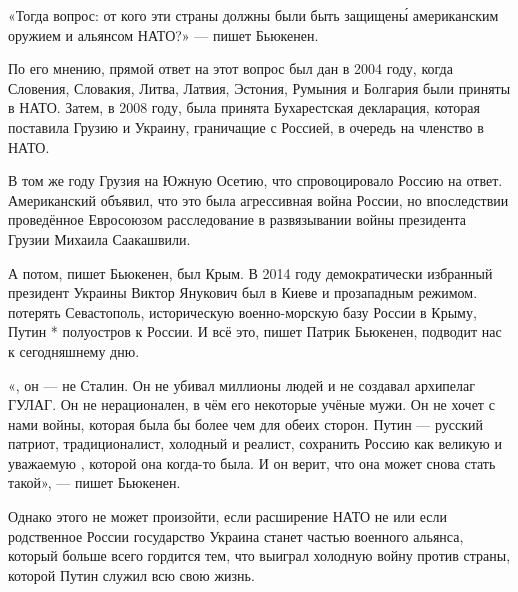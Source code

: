 \begin{fancyquotes}
    «Тогда   вопрос: от кого эти страны должны были быть защищен\'{ы} американским оружием и альянсом НАТО?» --- пишет Бьюкенен.
\end{fancyquotes}

По его мнению, прямой ответ на этот вопрос был дан в 2004 году, когда Словения, Словакия, Литва, Латвия, Эстония, Румыния и Болгария были приняты в НАТО. Затем, в 2008 году, была принята Бухарестская декларация, которая поставила Грузию и Украину, граничащие с Россией, в очередь на членство в НАТО.

В том же году Грузия  на Южную Осетию, что спровоцировало Россию на ответ. Американский  объявил, что это была агрессивная война России, но впоследствии проведённое Евросоюзом расследование  в развязывании войны президента Грузии Михаила Саакашвили.

А потом, пишет Бьюкенен, был Крым. В 2014 году демократически избранный президент Украины Виктор Янукович был  в Киеве и  прозападным режимом.  потерять Севастополь, историческую военно-морскую базу России в Крыму, Путин * полуостров к России. И всё это, пишет Патрик Бьюкенен, подводит нас к сегодняшнему дню.

\begin{fancyquotes}
    «, он --- не Сталин. Он не убивал миллионы людей и не создавал архипелаг ГУЛАГ. Он не нерационален, в чём  его некоторые учёные мужи. Он не хочет с нами войны, которая была бы более чем  для обеих сторон. Путин --- русский патриот, традиционалист, холодный и  реалист,  сохранить Россию как великую и уважаемую , которой она когда-то была. И он верит, что она может снова стать такой», --- пишет Бьюкенен.
\end{fancyquotes}

Однако этого не может произойти, если расширение НАТО не  или если родственное России государство Украина станет частью военного альянса, который больше всего гордится тем, что выиграл холодную войну против страны, которой Путин служил всю свою жизнь.

